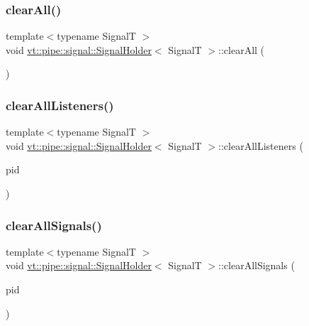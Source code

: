 \subsubsection{\texorpdfstring{clear\+All()}{clearAll()}}
{\footnotesize\ttfamily template$<$typename SignalT $>$ \\
void \hyperlink{structvt_1_1pipe_1_1signal_1_1_signal_holder}{vt\+::pipe\+::signal\+::\+Signal\+Holder}$<$ SignalT $>$\+::clear\+All (\begin{DoxyParamCaption}{ }\end{DoxyParamCaption})}

\mbox{\label{structvt_1_1pipe_1_1signal_1_1_signal_holder_a5ef82532eb8d0d65fe7b07f7fb53491d}} 
\subsubsection{\texorpdfstring{clear\+All\+Listeners()}{clearAllListeners()}}
{\footnotesize\ttfamily template$<$typename SignalT $>$ \\
void \hyperlink{structvt_1_1pipe_1_1signal_1_1_signal_holder}{vt\+::pipe\+::signal\+::\+Signal\+Holder}$<$ SignalT $>$\+::clear\+All\+Listeners (\begin{DoxyParamCaption}\item[{\hyperlink{namespacevt_ac9852acda74d1896f48f406cd72c7bd3}{Pipe\+Type} const \&}]{pid }\end{DoxyParamCaption})}

\mbox{\label{structvt_1_1pipe_1_1signal_1_1_signal_holder_a9907ff2a131c6aafe6771c09b6ae9415}} 
\subsubsection{\texorpdfstring{clear\+All\+Signals()}{clearAllSignals()}}
{\footnotesize\ttfamily template$<$typename SignalT $>$ \\
void \hyperlink{structvt_1_1pipe_1_1signal_1_1_signal_holder}{vt\+::pipe\+::signal\+::\+Signal\+Holder}$<$ SignalT $>$\+::clear\+All\+Signals (\begin{DoxyParamCaption}\item[{\hyperlink{namespacevt_ac9852acda74d1896f48f406cd72c7bd3}{Pipe\+Type} const \&}]{pid }\end{DoxyParamCaption})}

